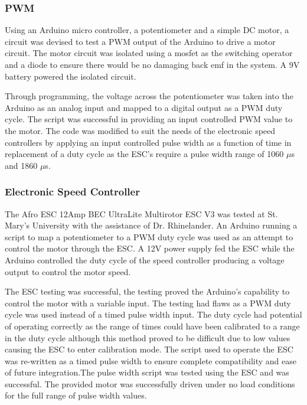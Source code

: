   \subsubsection{PWM}
  
Using an Arduino micro controller, a potentiometer and a simple DC motor, a circuit was devised to test a PWM output of the Arduino to drive a motor circuit. The motor circuit was isolated using a mosfet as the switching operator and a diode to ensure there would be no damaging back emf in the system. A 9V battery powered the isolated circuit.
  
Through programming, the voltage across the potentiometer was taken into the Arduino as an analog input and mapped to a digital output as a PWM duty cycle. The script was successful in providing an input controlled PWM value to the motor. The code was modified to suit the needs of the electronic speed controllers by applying an input controlled pulse width as a function of time in replacement of a duty cycle as the ESC's require a pulse width range of 1060 $\mu$s and 1860 $\mu$s.

  
  \subsubsection{Electronic Speed Controller}
  
The Afro ESC 12Amp BEC UltraLite Multirotor ESC V3 was tested at St. Mary's University with the assistance of Dr. Rhinelander. An Arduino running a script to map a potentiometer to a PWM duty cycle was used as an attempt to control the motor through the ESC. A 12V power supply fed the ESC while the Arduino controlled the duty cycle of the speed controller producing a voltage output to control the motor speed. 

The ESC testing was successful, the testing proved the Arduino's capability to control the motor with a variable input. The testing had flaws as a PWM duty cycle was used instead of a timed pulse width input. The duty cycle had potential of operating correctly as the range of times could have been calibrated to a range in the duty cycle although this method proved to be difficult due to low values causing the ESC to enter calibration mode. The script used to operate the ESC was re-written as a timed pulse width to ensure complete compatibility and ease of future integration.The pulse width script was tested using the ESC and was successful. The provided motor was successfully driven under no load conditions for the full range of pulse width values.

